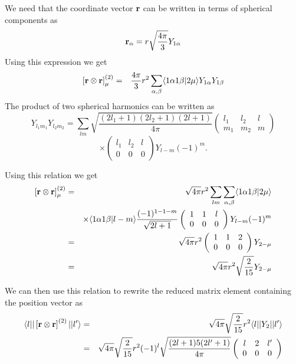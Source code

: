 We need that
the coordinate vector ${\bf r}$ can be written in terms of spherical 
components as 
\[
{\bf r}_\alpha = r\sqrt{\frac{4\pi}{3}} Y_{1\alpha}
\]
Using this expression we get 
\begin{eqnarray*}
\left[{\bf r} \otimes {\bf r} \right]^{(2)}_\mu &=& \frac{4\pi}{3}r^2
\sum_{\alpha ,\beta}\langle 1\alpha 1\beta |2\mu \rangle Y_{1\alpha} Y_{1\beta}
\end{eqnarray*}
The product of two spherical harmonics can be written
as
\[
Y_{l_1m_1} Y_{l_2m_2}=\sum_{lm}\sqrt{\frac{(2l_1+1)(2l_2+1)(2l+1)}{4\pi}}
\left(\begin{array}{ccc} l_1&l_2&l \\ m_1&m_2&m\end{array}\right)
\]
\[
\times \left(\begin{array}{ccc} l_1&l_2&l \\ 0  &0  &0\end{array}\right)
Y_{l-m}(-1)^m.
\]

Using this relation we get  
\begin{eqnarray*}
\left[{\bf r} \otimes {\bf r} \right]^{(2)}_\mu &=& 
\sqrt{4\pi}r^2
\sum_{lm}
\sum_{\alpha ,\beta}   \langle 1\alpha 1\beta |2\mu \rangle \\
&&\times \langle 1\alpha 1\beta |l-m \rangle
\frac{(-1)^{1-1-m}}{\sqrt{2l+1}} 
\left(\begin{array}{ccc} 1&1&l \\ 0  &0  &0\end{array}\right)Y_{l-m}(-1)^m\\
&=& \sqrt{4\pi}r^2
\left(\begin{array}{ccc} 1&1&2 \\ 0  &0  &0\end{array}\right)
Y_{2-\mu}\\
&=& \sqrt{4\pi}r^2 \sqrt{\frac{2}{15}}Y_{2-\mu}
\end{eqnarray*}

We can then  use this relation to rewrite the reduced matrix element containing the 
position vector as  
\begin{eqnarray*}
\langle l | |\left[{\bf r} \otimes {\bf r} \right]^{(2)} | |l'\rangle
& = & 
\sqrt{4\pi}\sqrt{ \frac{2}{15}}r^2 \langle l | |Y_2 | |l'\rangle \\
& = &\sqrt{4\pi}\sqrt{ \frac{2}{15}}  r^2 (-1)^l
\sqrt{\frac{(2l+1)5(2l'+1)}{4\pi}}
\left(\begin{array}{ccc} l&2&l' \\ 0&0&0\end{array}\right)
\end{eqnarray*}

